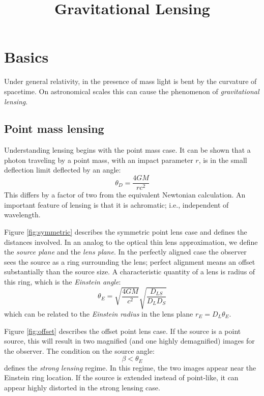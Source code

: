 \title{\bf Gravitational Lensing}

\section{Basics}

Under general relativity, in the presence of mass light is bent by the
curvature of spacetime. On astronomical scales this can cause the
phenomenon of {\it gravitational lensing}. 

\subsection{Point mass lensing}

Understanding lensing begins with the point mass case. It can be shown
that a photon traveling by a point mass, with an impact parameter $r$,
is in the small deflection limit deflected by an angle:
\begin{equation}
\theta_D = \frac{4GM}{rc^2} 
\end{equation}
This differs by a factor of two from the equivalent Newtonian
calculation. An important feature of lensing is that it is achromatic;
i.e., independent of wavelength.

Figure \ref{fig:symmetric} describes the symmetric point lens case and
defines the distances involved. In an analog to the optical thin lens
approximation, we define the {\it source plane} and the {\it lens
  plane}. In the perfectly aligned case the observer sees the source
as a ring surrounding the lens; perfect alignment means an offset
substantially than the source size.  A characteristic quantity of a
lens is radius of this ring, which is the {\it Einstein angle}:
\begin{equation}
\theta_E =  \sqrt{\frac{4GM}{c^2}} \sqrt{\frac{D_{LS}}{D_L D_S}}
\end{equation}
which can be related to the {\it Einstein radius} in the lens plane
$r_E = D_L \theta_E$.

Figure \ref{fig:offset} describes the offset point lens case. If the
source is a point source, this will result in two magnified (and one
highly demagnified) images for the observer. The condition on the
source angle:
\begin{equation}
\beta < \theta_E
\end{equation}
defines the {\it strong lensing} regime. In this regime, the two
images appear near the Einstein ring location. If the source is
extended instead of point-like, it can appear highly distorted in the
strong lensing case.

